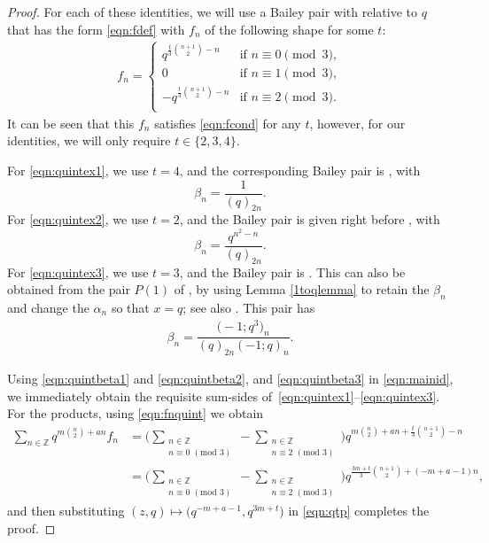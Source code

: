 \documentclass[pdftex]{sigma}
\numberwithin{equation}{section}
\newcommand{\ZZ}{\mathbb{Z}}
\begin{document}
\begin{proof}
For each of these identities, we will use a Bailey pair with relative to $q$ that has the form \eqref{eqn:fdef} with $f_n$ of the following shape for some $t$:
\begin{align} \label{eqn:fnquint}
	f_n = \begin{cases}
		q^{\frac{t}{3}\binom{n+1}{2}-n} & \text{if $n\equiv 0 \pmod{3}$},\\
		0 & \text{if $n \equiv 1 \pmod{3}$},\\
		-q^{\frac{t}{3}\binom{n+1}{2}-n} & \text{if $n \equiv 2 \pmod{3}$}.\\
	\end{cases}
\end{align}
It can be seen that this $f_n$ satisfies \eqref{eqn:fcond} for any $t$, however, for our identities, we will only require $t\in\{2,3,4\}$.

For \eqref{eqn:quintex1}, we use $t=4$, and the corresponding Bailey pair is \cite[equation~(4.6)]{Wa1}, with
\begin{equation} \label{eqn:quintbeta1}
	\beta_n = \frac{1}{(q)_{2n}}.
\end{equation}
For \eqref{eqn:quintex2}, we use $t=2$, and the Bailey pair is given right before \cite[Theorem~4.1]{Wa1}, with
\begin{equation} \label{eqn:quintbeta2}
	\beta_n = \frac{q^{n^2-n}}{(q)_{2n}}.
\end{equation}
For \eqref{eqn:quintex3}, we use $t=3$, and the Bailey pair is \cite[P(6)]{McLS}. This can also be obtained from the pair $P(1)$ of \cite{McLS}, by using Lemma \ref{1toqlemma} to retain the $\beta_n$ and change the $\alpha_n$ so that $x=q$; see also \cite{KR}. This pair has
\begin{align} \label{eqn:quintbeta3}
	\beta_n = \dfrac{\bigl(-1;q^3\bigr)_n}{(q)_{2n}(-1;q)_n}.
\end{align}

Using \eqref{eqn:quintbeta1} and \eqref{eqn:quintbeta2}, and \eqref{eqn:quintbeta3} in \eqref{eqn:mainid}, we immediately obtain the requisite sum-sides of~\eqref{eqn:quintex1}--\eqref{eqn:quintex3}. For the products, using \eqref{eqn:fnquint} we obtain
\begin{align*}
	\sum_{n\in\ZZ}
	q^{m\binom{n}{2}+an}f_n
	&{}=
	\Biggl(\sum_{\substack{n\in\ZZ\\ n\equiv 0\,\,(\mathrm{mod}\,\,3)}}
	-\sum_{\substack{n\in\ZZ\\ n\equiv 2\,\,(\mathrm{mod}\,\,3)}}\Biggr)
	q^{m\binom{n}{2}+an+\frac{t}{3}\binom{n+1}{2}-n} \\
	&{}=
	\Biggl(\sum_{\substack{n\in\ZZ\\ n\equiv 0\,\,(\mathrm{mod}\,\,3)}}
	-\sum_{\substack{n\in\ZZ\\ n\equiv 2\,\,(\mathrm{mod}\,\,3)}}\Biggr)
	q^{\frac{3m+t}{3}\binom{n+1}{2}+(-m+a-1)n},
\end{align*}
and then substituting $(z,q)\mapsto \bigl(q^{-m+a-1},q^{3m+t}\bigr)$ in \eqref{eqn:qtp} completes the proof.
\end{proof}
\end{document}
